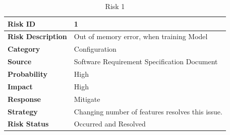 \documentclass[oneside,a4paper,12pt]{pictreport}
\begin{document}
\begin{table}[h!]
\centering
\caption{Risk 1}
\label{my-label}
\begin{tabular}{|l|l|}
\hline
\textbf{Risk ID}          & 1                                                    \\ \hline
\textbf{Risk Description} & Out of memory error, when training Model \\ \hline
\textbf{Category}         & Configuration                                        \\ \hline
\textbf{Source}           & Software Requirement Specification Document          \\ \hline
\textbf{Probability}      & High                                                 \\ \hline
\textbf{Impact}           & High                                                 \\ \hline
\textbf{Response}         & Mitigate                                             \\ \hline
\textbf{Strategy}         & Changing number of features resolves this issue.     \\ \hline
\textbf{Risk Status}      & Occurred and Resolved                                \\ \hline
\end{tabular}
\end{table}
\end{document}
